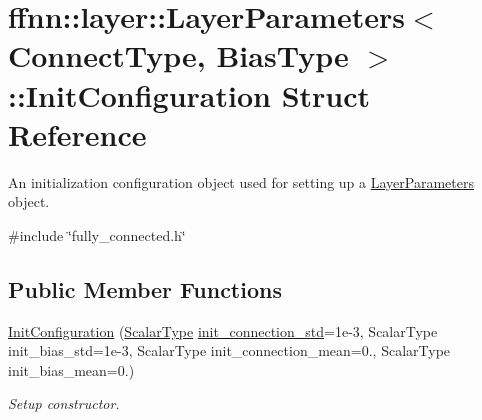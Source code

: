 \hypertarget{structffnn_1_1layer_1_1_layer_parameters_1_1_init_configuration}{\section{ffnn\-:\-:layer\-:\-:Layer\-Parameters$<$ Connect\-Type, Bias\-Type $>$\-:\-:Init\-Configuration Struct Reference}
\label{structffnn_1_1layer_1_1_layer_parameters_1_1_init_configuration}
}


An initialization configuration object used for setting up a \hyperlink{classffnn_1_1layer_1_1_layer_parameters}{Layer\-Parameters} object.  




{\ttfamily \#include \char`\"{}fully\-\_\-connected.\-h\char`\"{}}

\subsection*{Public Member Functions}
\begin{DoxyCompactItemize}
\item 
\hyperlink{structffnn_1_1layer_1_1_layer_parameters_1_1_init_configuration_a64e407c571df70f766f073671284f6b3}{Init\-Configuration} (\hyperlink{classffnn_1_1layer_1_1_layer_parameters_a3dd1354de05cbf7c05d82a8ed653714e}{Scalar\-Type} \hyperlink{structffnn_1_1layer_1_1_layer_parameters_1_1_init_configuration_ad8f3d53cb4491d2db5378d929bddfcb6}{init\-\_\-connection\-\_\-std}=1e-\/3, Scalar\-Type init\-\_\-bias\-\_\-std=1e-\/3, Scalar\-Type init\-\_\-connection\-\_\-mean=0., Scalar\-Type init\-\_\-bias\-\_\-mean=0.)
\begin{DoxyCompactList}\small\item\em Setup constructor. \end{DoxyCompactList}\end{DoxyCompactItemize}

